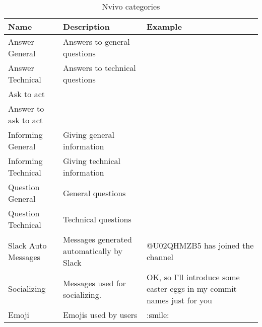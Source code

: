 \begin{table}[ht]
\caption{Nvivo categories} %
\centering %
\begin{tabu} to 0.9\textwidth { | X[c] | X[c] | X[c] | } %
\hline\hline %
Name & Description & Example \\ [0.9ex] %
\hline %
Answer General & Answers to general questions & \\ %
\hline
Answer Technical & Answers to technical questions & \\
\hline
Ask to act & & \\
\hline
Answer to ask to act & & \\
\hline
Informing General & Giving general information & \\
\hline
Informing Technical & Giving technical information  & \\
\hline
Question General &  General questions & \\
\hline
Question Technical & Technical questions & \\
\hline
Slack Auto Messages & Messages generated automatically by Slack & @U02QHMZB5 has joined the channel \\
\hline
Socializing & Messages used for socializing. & OK, so I'll introduce some easter eggs in my commit names just for you\\
\hline
Emoji & Emojis used by users & :smile: \\ [1ex] %
\hline %
\end{tabu}
\label{table:nvivo} %
\end{table}